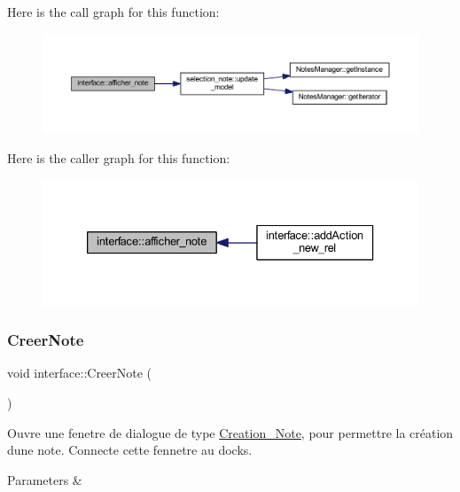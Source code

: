 Here is the call graph for this function\+:\nopagebreak
\begin{figure}[H]
\begin{center}
\leavevmode
\includegraphics[width=350pt]{classinterface_a320051a7a36aa24f53b12df82649f15f_cgraph}
\end{center}
\end{figure}
Here is the caller graph for this function\+:\nopagebreak
\begin{figure}[H]
\begin{center}
\leavevmode
\includegraphics[width=333pt]{classinterface_a320051a7a36aa24f53b12df82649f15f_icgraph}
\end{center}
\end{figure}
\mbox{\label{classinterface_a23957135caad59d8850fe8e2cbee28a3}} 
\subsubsection{\texorpdfstring{Creer\+Note}{CreerNote}}
{\footnotesize\ttfamily void interface\+::\+Creer\+Note (\begin{DoxyParamCaption}{ }\end{DoxyParamCaption})\hspace{0.3cm}{\ttfamily [slot]}}



Ouvre une fenetre de dialogue de type \hyperlink{class_creation___note}{Creation\+\_\+\+Note}, pour permettre la création d\textquotesingle{}une note. Connecte cette fennetre au docks. 


\begin{DoxyParams}{Parameters}
{\em } & \\
\hline
\end{DoxyParams}


